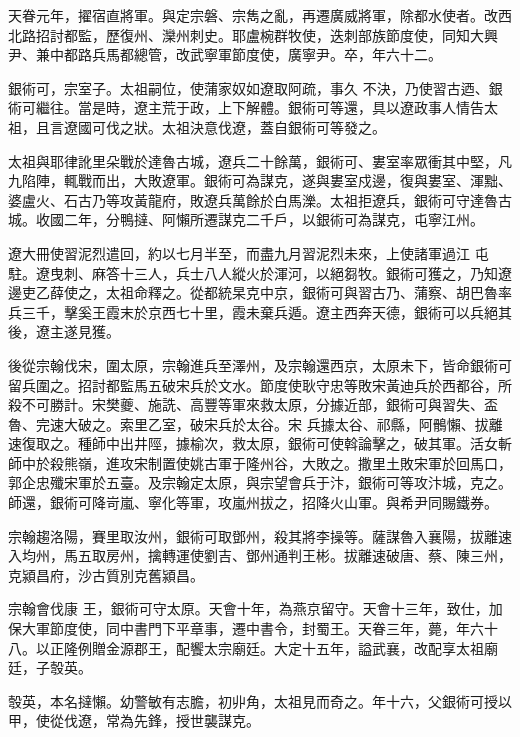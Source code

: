 \begin{pinyinscope}
 天眷元年，擢宿直將軍。與定宗磐、宗雋之亂，再遷廣威將軍，除都水使者。改西北路招討都監，歷復州、灤州刺史。耶盧椀群牧使，迭刺部族節度使，同知大興尹、兼中都路兵馬都總管，改武寧軍節度使，廣寧尹。卒，年六十二。



 銀術可，宗室子。太祖嗣位，使蒲家奴如遼取阿疏，事久
 不決，乃使習古迺、銀術可繼往。當是時，遼主荒于政，上下解體。銀術可等還，具以遼政事人情告太祖，且言遼國可伐之狀。太祖決意伐遼，蓋自銀術可等發之。



 太祖與耶律訛里朵戰於達魯古城，遼兵二十餘萬，銀術可、婁室率眾衝其中堅，凡九陷陣，輒戰而出，大敗遼軍。銀術可為謀克，遂與婁室戍邊，復與婁室、渾黜、婆盧火、石古乃等攻黃龍府，敗遼兵萬餘於白馬濼。太祖拒遼兵，銀術可守達魯古城。收國二年，分鴨撻、阿懶所遷謀克二千戶，以銀術可為謀克，屯寧江州。



 遼大冊使習泥烈遣回，約以七月半至，而盡九月習泥烈未來，上使諸軍過江
 屯駐。遼曳刺、麻答十三人，兵士八人縱火於渾河，以絕芻牧。銀術可獲之，乃知遼邊吏乙薛使之，太祖命釋之。從都統杲克中京，銀術可與習古乃、蒲察、胡巴魯率兵三千，擊奚王霞末於京西七十里，霞未棄兵遁。遼主西奔天德，銀術可以兵絕其後，遼主遂見獲。



 後從宗翰伐宋，圍太原，宗翰進兵至澤州，及宗翰還西京，太原未下，皆命銀術可留兵圍之。招討都監馬五破宋兵於文水。節度使耿守忠等敗宋黃迪兵於西都谷，所殺不可勝計。宋樊夔、施詵、高豐等軍來救太原，分據近部，銀術可與習失、盃魯、完速大破之。索里乙室，破宋兵於太谷。宋
 兵據太谷、祁縣，阿鶻懶、拔離速復取之。種師中出井陘，據榆次，救太原，銀術可使斡論擊之，破其軍。活女斬師中於殺熊嶺，進攻宋制置使姚古軍于隆州谷，大敗之。撒里土敗宋軍於回馬口，郭企忠殲宋軍於五臺。及宗翰定太原，與宗望會兵于汴，銀術可等攻汴城，克之。師還，銀術可降岢嵐、寧化等軍，攻嵐州拔之，招降火山軍。與希尹同賜鐵券。



 宗翰趨洛陽，賽里取汝州，銀術可取鄧州，殺其將李操等。薩謀魯入襄陽，拔離速入均州，馬五取房州，擒轉運使劉吉、鄧州通判王彬。拔離速破唐、蔡、陳三州，克潁昌府，沙古質別克舊潁昌。



 宗翰會伐康
 王，銀術可守太原。天會十年，為燕京留守。天會十三年，致仕，加保大軍節度使，同中書門下平章事，遷中書令，封蜀王。天眷三年，薨，年六十八。以正隆例贈金源郡王，配饗太宗廟廷。大定十五年，謚武襄，改配享太祖廟廷，子彀英。



 彀英，本名撻懶。幼警敏有志膽，初丱角，太祖見而奇之。年十六，父銀術可授以甲，使從伐遼，常為先鋒，授世襲謀克。




\end{pinyinscope}
